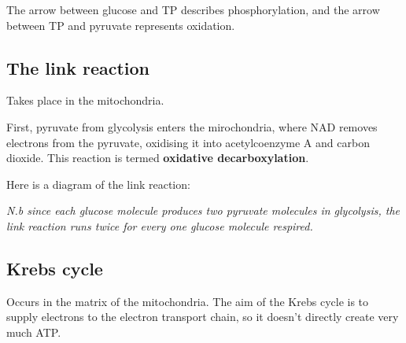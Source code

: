 \documentclass{article}
\begin{document}
The arrow between glucose and TP describes phosphorylation, and the arrow
between TP and pyruvate represents oxidation.

\subsection*{The link reaction}
Takes place in the mitochondria.

First, pyruvate from glycolysis enters the mirochondria, where NAD removes
electrons from the pyruvate, oxidising it into acetylcoenzyme A and carbon
dioxide. This reaction is termed \textbf{oxidative decarboxylation}.

Here is a diagram of the link reaction:

\begin{center}
\end{center}

\textit{N.b since each glucose molecule produces two pyruvate molecules in
glycolysis, the link reaction runs twice for every one glucose molecule
respired.}

\subsection*{Krebs cycle}
Occurs in the matrix of the mitochondria. The aim of the Krebs cycle is to
supply electrons to the electron transport chain, so it doesn't directly
create very much ATP.
\end{document}
